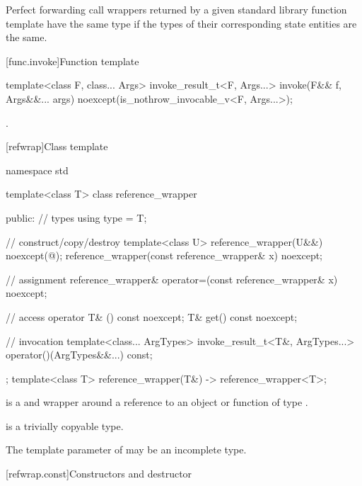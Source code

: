 \pnum
Perfect forwarding call wrappers returned by
a given standard library function template have the same type
if the types of their corresponding state entities are the same.

[func.invoke]{Function template }
%
%
\begin{itemdecl}
template<class F, class... Args>
  invoke_result_t<F, Args...> invoke(F&& f, Args&&... args)
    noexcept(is_nothrow_invocable_v<F, Args...>);
\end{itemdecl}

\begin{itemdescr}
\pnum
\returns
{}.
\end{itemdescr}

[refwrap]{Class template }

%
%
\begin{codeblock}
namespace std {
  template<class T> class reference_wrapper {
  public:
    // types
    using type = T;

    // construct/copy/destroy
    template<class U>
      reference_wrapper(U&&) noexcept(@\seebelow@);
    reference_wrapper(const reference_wrapper& x) noexcept;

    // assignment
    reference_wrapper& operator=(const reference_wrapper& x) noexcept;

    // access
    operator T& () const noexcept;
    T& get() const noexcept;

    // invocation
    template<class... ArgTypes>
      invoke_result_t<T&, ArgTypes...> operator()(ArgTypes&&...) const;
  };
  template<class T>
    reference_wrapper(T&) -> reference_wrapper<T>;
}
\end{codeblock}

\pnum
{} is a  and  wrapper
around a reference to an object or function of type .

\pnum
{} is a trivially copyable type.

\pnum
The template parameter  of 
may be an incomplete type.

[refwrap.const]{Constructors and destructor}

